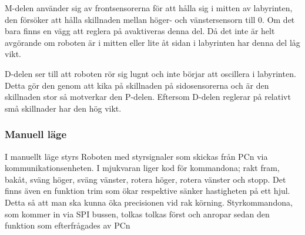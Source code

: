 M-delen använder sig av frontsensorerna för att hålla sig i mitten av
labyrinten, den försöker att hålla skillnaden mellan höger- och vänstersensorn
till 0. Om det bara finns en vägg att reglera på avaktiveras denna del. Då det
inte är helt avgörande om roboten är i mitten eller lite åt sidan i labyrinten
har denna del låg vikt.


D-delen ser till att roboten rör sig lugnt och inte börjar att oscillera i
labyrinten. Detta gör den genom att kika på skillnaden på sidosensorerna och är
den skillnaden stor så motverkar den P-delen. Eftersom D-delen reglerar på
relativt små skillnader har den hög vikt.

\label{reglering}

\subsubsection{Manuell läge}

I manuellt läge styrs Roboten med styrsignaler som skickas från PCn via 
kommunikationsenheten. I mjukvaran liger kod för kommandona; rakt 
fram, bakåt, sväng höger, sväng vänster, rotera höger, rotera vänster
och stopp. Det finns även en funktion trim som ökar respektive sänker 
hastigheten på ett hjul. Detta så att man ska kunna öka precisionen vid 
rak körning. Styrkommandona, som kommer in via SPI bussen, tolkas 
tolkas först och anropar sedan den funktion som efterfrågades av PCn



	


